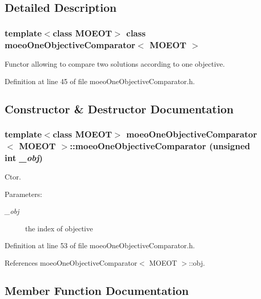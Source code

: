 \subsection{Detailed Description}
\subsubsection*{template$<$class MOEOT$>$ class moeo\-One\-Objective\-Comparator$<$ MOEOT $>$}

Functor allowing to compare two solutions according to one objective. 



Definition at line 45 of file moeo\-One\-Objective\-Comparator.h.

\subsection{Constructor \& Destructor Documentation}
\subsubsection{\setlength{\rightskip}{0pt plus 5cm}template$<$class MOEOT$>$ \bf{moeo\-One\-Objective\-Comparator}$<$ MOEOT $>$::\bf{moeo\-One\-Objective\-Comparator} (unsigned int {\em \_\-obj})\hspace{0.3cm}{\tt  [inline]}}\label{classmoeoOneObjectiveComparator_be1249440803553ef868182019d49e4d}


Ctor. 

\begin{Desc}
\item[Parameters:]
\begin{description}
\item[{\em \_\-obj}]the index of objective \end{description}
\end{Desc}


Definition at line 53 of file moeo\-One\-Objective\-Comparator.h.

References moeo\-One\-Objective\-Comparator$<$ MOEOT $>$::obj.

\subsection{Member Function Documentation}
